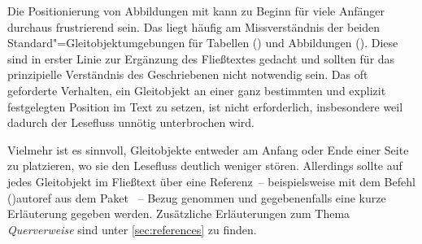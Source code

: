 \documentclass[%
  english,ngerman,%
  cdgeometry=no,DIV=12,%
  cd=false,cdfont=false,cdtitle=true,%
  headings=normal,%
  automark,%
  listof=toc,%
]{tudscrartcl}
\begin{document}
Die Positionierung von Abbildungen mit  kann zu Beginn für 
viele Anfänger durchaus frustrierend sein. Das liegt häufig am Missverständnis 
der beiden Standard"=Gleitobjektumgebungen für Tabellen () 
und Abbildungen (). Diese sind in erster Linie zur 
Ergänzung des Fließtextes gedacht und sollten für das prinzipielle Verständnis 
des Geschriebenen nicht notwendig sein. Das oft geforderte Verhalten, ein 
Gleitobjekt an einer ganz bestimmten und explizit festgelegten Position im Text 
zu setzen, ist nicht erforderlich, insbesondere weil dadurch der Lesefluss 
unnötig unterbrochen wird. 

Vielmehr ist es sinnvoll, Gleitobjekte entweder am Anfang oder Ende einer Seite 
zu platzieren, wo sie den Lesefluss deutlich weniger stören. Allerdings sollte 
auf jedes Gleitobjekt im Fließtext über eine Referenz~-- beispielsweise mit dem 
Befehl \Macro(){autoref} aus dem Paket ~-- 
Bezug genommen und gegebenenfalls eine kurze Erläuterung gegeben werden. 
Zusätzliche Erläuterungen zum Thema \emph{Querverweise} sind unter 
\autoref{sec:references} zu finden.
\end{document}
